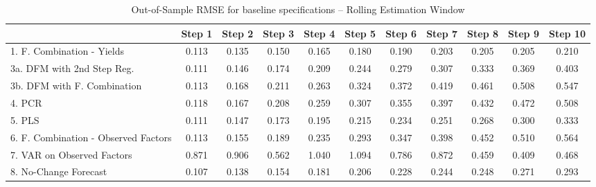 \documentclass[11pt]{article}
\begin{document}
\begin{table}       
\caption{Out-of-Sample RMSE for baseline specifications -- Rolling Estimation Window} \label{table_rmse_baseline}                                                                              
\center                                                                                           
\begin{tabular}{|l|c|c|c|c|c|c|c|c|c|c|}                                                          
\hline                                                                                            
&Step 1 &Step 2 &Step 3 &Step 4 &Step 5 &Step 6 &Step 7 &Step 8 &Step 9 &Step 10\\                
\hline                                                                                            
1. F. Combination - Yields          &0.113&0.135&0.150&0.165&0.180&0.190&0.203&0.205&0.205&0.210\\
3a. DFM with 2nd Step Reg.          &0.111&0.146&0.174&0.209&0.244&0.279&0.307&0.333&0.369&0.403\\
3b. DFM with F. Combination         &0.113&0.168&0.211&0.263&0.324&0.372&0.419&0.461&0.508&0.547\\
4. PCR                              &0.118&0.167&0.208&0.259&0.307&0.355&0.397&0.432&0.472&0.508\\
5. PLS                              &0.111&0.147&0.173&0.195&0.215&0.234&0.251&0.268&0.300&0.333\\
6. F. Combination - Observed Factors&0.113&0.155&0.189&0.235&0.293&0.347&0.398&0.452&0.510&0.564\\
7. VAR on Observed Factors          &0.871&0.906&0.562&1.040&1.094&0.786&0.872&0.459&0.409&0.468\\
8. No-Change Forecast               &0.107&0.138&0.154&0.181&0.206&0.228&0.244&0.248&0.271&0.293\\
\hline                                                                                            
\end{tabular}                                                                                     
\end{table}                                                                                       
\end{document}

